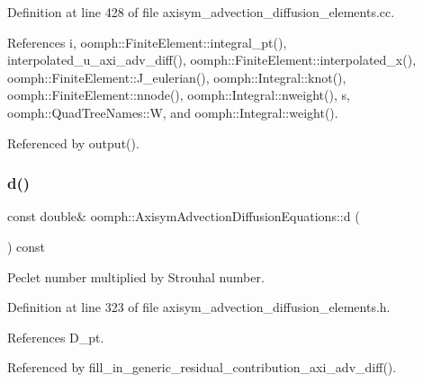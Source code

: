 Definition at line 428 of file axisym\+\_\+advection\+\_\+diffusion\+\_\+elements.\+cc.



References i, oomph\+::\+Finite\+Element\+::integral\+\_\+pt(), interpolated\+\_\+u\+\_\+axi\+\_\+adv\+\_\+diff(), oomph\+::\+Finite\+Element\+::interpolated\+\_\+x(), oomph\+::\+Finite\+Element\+::\+J\+\_\+eulerian(), oomph\+::\+Integral\+::knot(), oomph\+::\+Finite\+Element\+::nnode(), oomph\+::\+Integral\+::nweight(), s, oomph\+::\+Quad\+Tree\+Names\+::W, and oomph\+::\+Integral\+::weight().



Referenced by output().

\mbox{\label{classoomph_1_1AxisymAdvectionDiffusionEquations_a986c66e2d8e39d56e79633c905cf6833}} 
\subsubsection{\texorpdfstring{d()}{d()}}
{\footnotesize\ttfamily const double\& oomph\+::\+Axisym\+Advection\+Diffusion\+Equations\+::d (\begin{DoxyParamCaption}{ }\end{DoxyParamCaption}) const\hspace{0.3cm}{\ttfamily [inline]}}



Peclet number multiplied by Strouhal number. 



Definition at line 323 of file axisym\+\_\+advection\+\_\+diffusion\+\_\+elements.\+h.



References D\+\_\+pt.



Referenced by fill\+\_\+in\+\_\+generic\+\_\+residual\+\_\+contribution\+\_\+axi\+\_\+adv\+\_\+diff().

\mbox{\label{classoomph_1_1AxisymAdvectionDiffusionEquations_a06ebb3defb017029d98fdff300cef261}} 
